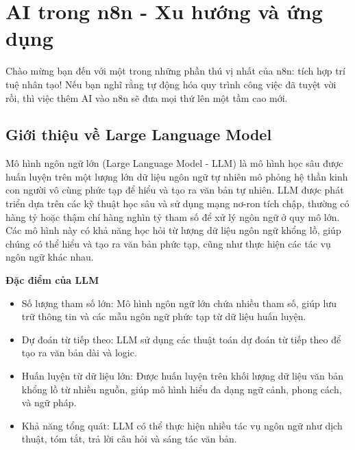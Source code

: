 \chapter{AI trong n8n - Xu hướng và ứng dụng}
Chào mừng bạn đến với một trong những phần thú vị nhất của n8n: tích hợp trí tuệ nhân tạo! Nếu bạn nghĩ rằng tự động hóa quy trình công việc đã tuyệt vời rồi, thì việc thêm AI vào n8n sẽ đưa mọi thứ lên một tầm cao mới.


\section{Giới thiệu về Large Language Model}
Mô hình ngôn ngữ lớn (Large Language Model - LLM) là mô hình học sâu được huấn luyện trên một lượng lớn dữ liệu ngôn ngữ tự nhiên mô phỏng hệ thần kinh con người vô cùng phức tạp để hiểu và tạo ra văn bản tự nhiên. LLM được phát triển dựa trên các kỹ thuật học sâu và sử dụng mạng nơ-ron tích chập, thường có hàng tỷ hoặc thậm chí hàng nghìn tỷ tham số để xử lý ngôn ngữ ở quy mô lớn. Các mô hình này có khả năng học hỏi từ lượng dữ liệu ngôn ngữ khổng lồ, giúp chúng có thể hiểu và tạo ra văn bản phức tạp, cũng như thực hiện các tác vụ ngôn ngữ khác nhau. 




\textbf{Đặc điểm của LLM}
\begin{itemize}
    \item Số lượng tham số lớn: Mô hình ngôn ngữ lớn chứa nhiều tham số, giúp lưu trữ thông tin và các mẫu ngôn ngữ phức tạp từ dữ liệu huấn luyện.

    \item Dự đoán từ tiếp theo: LLM sử dụng các thuật toán dự đoán từ tiếp theo để tạo ra văn bản dài và logic.

    \item Huấn luyện từ dữ liệu lớn: Được huấn luyện trên khối lượng dữ liệu văn bản khổng lồ từ nhiều nguồn, giúp mô hình hiểu đa dạng ngữ cảnh, phong cách, và ngữ pháp.

    \item Khả năng tổng quát: LLM có thể thực hiện nhiều tác vụ ngôn ngữ như dịch thuật, tóm tắt, trả lời câu hỏi và sáng tác văn bản. 
\end{itemize}


